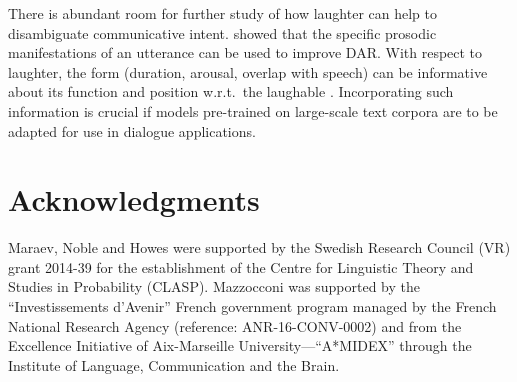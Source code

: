 \documentclass[11pt,a4paper]{article}
\begin{document}

There is abundant room for further study of how laughter can help to disambiguate communicative intent. 
\citet{stolckeDialogueActModeling2000} showed that the specific prosodic manifestations of an utterance can be used to improve DAR.
With respect to laughter, the form (duration, arousal, overlap with speech) can be informative about its function and position w.r.t.\ the laughable \citep{mazzocconi2019phd}.
Incorporating such information is crucial if models pre-trained on large-scale text corpora are to be adapted for use in dialogue applications.






\section*{Acknowledgments}
Maraev, Noble and Howes were supported by  the Swedish Research Council (VR) grant  2014-39 for the establishment of the Centre for Linguistic Theory and Studies in Probability (CLASP). Mazzocconi was supported by the “Investissements d’Avenir” French government program managed by the French National Research Agency (reference: ANR-16-CONV-0002) and from the Excellence Initiative of Aix-Marseille University—“A*MIDEX” through the Institute of Language, Communication and the Brain.





\appendix
\onecolumn
\end{document}
